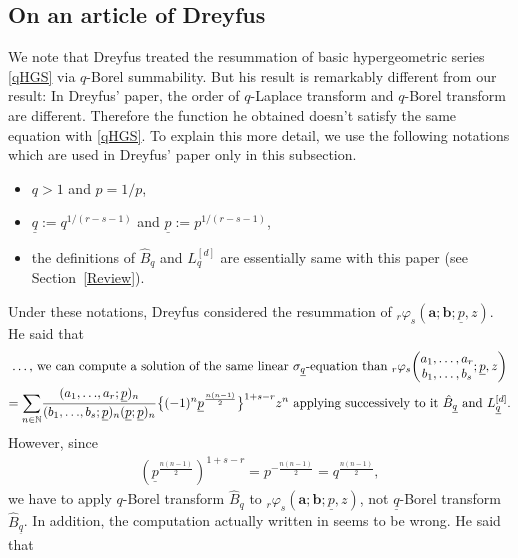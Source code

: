 \documentclass[pdftex]{sigma}
\numberwithin{equation}{section}
\begin{document}
\subsection*{On an article of Dreyfus}
We note that Dreyfus \cite{Dreyfus2015_2} treated the resummation of basic hypergeometric series \eqref{qHGS} via $q$-Borel summability. But his result is remarkably different from our result: In Dreyfus' paper, the order of $q$-Laplace transform and $q$-Borel transform are different. Therefore the function he obtained doesn't satisfy the same equation with \eqref{qHGS}. To explain this more detail, we use the following notations which are used in Dreyfus' paper \cite{Dreyfus2015_2} only in this subsection.
\begin{itemize}\itemsep=0pt
\item $q>1$ and $p=1/p$,
\item $\underline{q}:=q^{1/(r-s-1)}$ and $\underline{p}:=p^{1/(r-s-1)}$,
\item the definitions of $\hat{B}_q$ and $L_{q}^{[d]}$ are essentially same with this paper (see Section~\ref{Review}).
\end{itemize}
Under these notations, Dreyfus considered the resummation of ${}_r\varphi_s(\bm{a};\bm{b};\underline{p},z)$. He said that~\cite[pp.~478--479]{Dreyfus2015_2}
\begin{gather*}
\text{\dots, we can compute a solution of the same linear $\displaystyle\sigma_{\underline{q}}$-equation than ${}_r\varphi_s\!\left(
\begin{matrix}
a_1,\ldots,a_r\\
b_1,\ldots,b_s
\end{matrix};\underline{p},z
\right)$}\\
\text{$=\sum\limits_{n\in\mathbb{N}}\!\frac{(a_1,{\ldots},a_r;\underline{p})_n}{(b_1,{\ldots},b_s;\underline{p})_n(\underline{p};\underline{p})_n}\big\{(-1)^n\underline{p}^{\frac{n(n-1)}{2}}\big\}^{1+s-r}z^n$ applying successively to it $\hat{B}_{\underline{q}}$~and~$L_{\underline{q}}^{[d]}$.}
\end{gather*}
However, since
\begin{gather*}
\left(\underline{p}^{\frac{n(n-1)}{2}}\right)^{1+s-r}=p^{-\frac{n(n-1)}{2}}=q^{\frac{n(n-1)}{2}},
\end{gather*}
we have to apply $q$-Borel transform $\hat{B}_q$ to ${}_r\varphi_s(\bm{a};\bm{b};\underline{p},z)$, not $\underline{q}$-Borel transform $\hat{B}_{\underline{q}}$. In addition, the computation actually written in \cite{Dreyfus2015_2} seems to be wrong. He said that \cite[p.~479]{Dreyfus2015_2}
\end{document}
